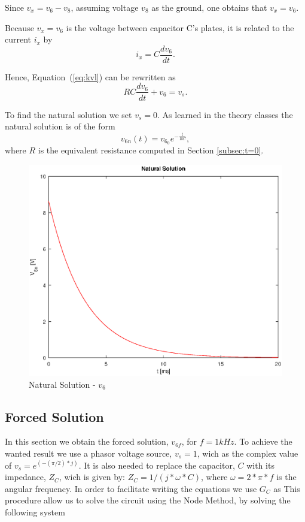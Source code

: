 Since $v_{x}=v_{6}-v_{8}$, assuming voltage $v_8$ as the ground, one obtains that $v_{x}=v_{6}$.

Because $v_{x}=v_{6}$ is the voltage between capacitor C's plates, it is related to the
current $i_x$ by
\begin{equation}
  i_{x} = C\frac{dv_6}{dt}.
\end{equation}

Hence, Equation~(\ref{eq:kvl}) can be rewritten as
\begin{equation}
  RC\frac{dv_6}{dt} + v_6 = v_s.
  \label{eq:kvl2}
\end{equation}

To find the natural solution we set $v_{s}=0$.
As learned in the theory classes the natural solution is of the form
\begin{equation}
  v_{6n}(t) = v_{6_0}e^{-\frac{t}{RC}},
  \label{eq:vo_nat}
\end{equation}
where $R$ is the equivalent resistance computed in Section \ref{subsec:t=0}. 


\begin{figure}[H] \centering
  \includegraphics[width=0.8\linewidth]{nat_sol.eps}
  \caption{Natural Solution - $v_6$}
  \label{fig:natural solution}
\end{figure}


\newpage
\subsection{Forced Solution}
\label{subsec:forced_solution}

In this section we obtain the forced solution, $v_{6f}$, for $f=1kHz$.
To achieve the wanted result we use a phasor voltage source, $v_{s}=1$, wich as the complex value of $v_{s}=e^{(-(\pi/2)*j)}$.
It is also needed to replace the capacitor, $C$ with its impedance, $Z_C$, wich is given by: $Z_{C}= 1/(j*\omega*C)$, where $\omega=2*\pi*f$ is the angular frequency.
In order to facilitate writing the equations we use $G_C$ as %
This procedure allow us to solve the circuit using the Node Method, by solving the following system

